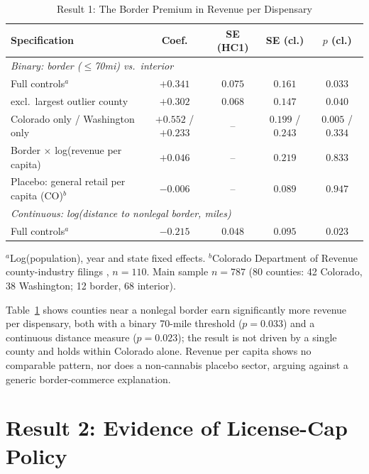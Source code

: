 \documentclass[5p]{elsarticle}
\begin{document}
\begin{table}[h]
\centering
\caption{Result 1: The Border Premium in Revenue per Dispensary}
\label{tab:result1}
\small
\begin{tabular}{lcccc}
\toprule
Specification & Coef. & SE (HC1) & SE (cl.) & $p$ (cl.) \\
\midrule
\multicolumn{5}{l}{\textit{Binary: border ($\le$70mi) vs.\ interior}} \\
Full controls$^{a}$ & $+0.341$ & $0.075$ & $0.161$ & $0.033$ \\
\quad excl.\ largest outlier county & $+0.302$ & $0.068$ & $0.147$ & $0.040$ \\
Colorado only / Washington only & $+0.552$ / $+0.233$ & -- & $0.199$ / $0.243$ & $0.005$ / $0.334$ \\
Border $\times$ log(revenue per capita) & $+0.046$ & -- & $0.219$ & $0.833$ \\
Placebo: general retail per capita (CO)$^{b}$ & $-0.006$ & -- & $0.089$ & $0.947$ \\
\midrule
\multicolumn{5}{l}{\textit{Continuous: log(distance to nonlegal border, miles)}} \\
Full controls$^{a}$ & $-0.215$ & $0.048$ & $0.095$ & $0.023$ \\
\bottomrule
\end{tabular}
\begin{minipage}{0.95\textwidth}
\vspace{0.2em}
\footnotesize $^{a}$Log(population), year and state fixed effects. $^{b}$Colorado Department of Revenue
county-industry filings \citep{CDORRetailByCounty}, $n=110$. Main sample $n=787$ (80 counties: 42 Colorado,
38 Washington; 12 border, 68 interior).
\end{minipage}
\end{table}

Table~\ref{tab:result1} shows counties near a nonlegal border earn significantly more revenue per
dispensary, both with a binary 70-mile threshold ($p=0.033$) and a continuous distance measure ($p=0.023$);
the result is not driven by a single county and holds within Colorado alone. Revenue per capita shows no
comparable pattern, nor does a non-cannabis placebo sector, arguing against a generic border-commerce
explanation.

\section{Result 2: Evidence of License-Cap Policy}
\end{document}

